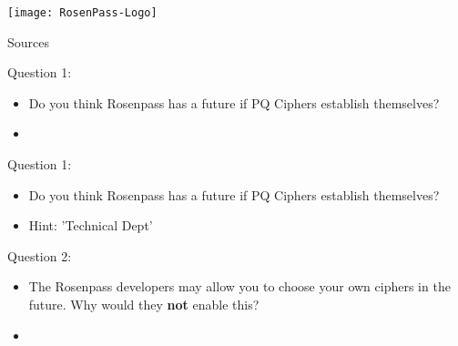 \documentclass{rosenpass-beamer}
\begin{document}

\begin{frame}
\centering
\texttt{[image: RosenPass-Logo]}
\end{frame}


\begin{frame}{Sources}
  \printbibliography
\end{frame}

\edef\totalcontentframes{\theframenumber}


\begin{frame}{Question 1:}
\begin{itemize}
  \item Do you think Rosenpass has a future if PQ Ciphers establish themselves?
  \item 
\end{itemize}
\end{frame}


\begin{frame}{Question 1:}
\begin{itemize}
  \item Do you think Rosenpass has a future if PQ Ciphers establish themselves?
  \item Hint: 'Technical Dept'
\end{itemize}
\end{frame}


\begin{frame}{Question 2:}
\begin{itemize}
  \item The Rosenpass developers may allow you to choose your own ciphers in the future.
    Why would they \textbf{not} enable this?
  \item 
\end{itemize}
\end{frame}
\end{document}
